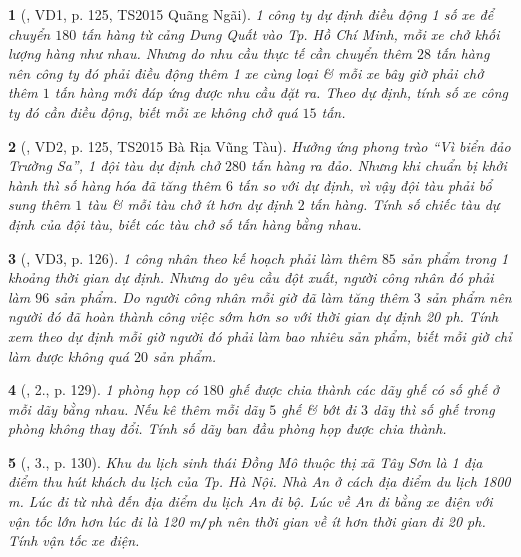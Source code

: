 \documentclass{article}
\newtheorem{baitoan}{}
\begin{document}
\begin{baitoan}[\cite{Kien_dai_so_9}, VD1, p. 125, TS2015 Quãng Ngãi]
	1 công ty dự định điều động 1 số xe để chuyển $180$ tấn hàng từ cảng Dung Quất vào Tp. Hồ Chí Minh, mỗi xe chở khối lượng hàng như nhau. Nhưng do nhu cầu thực tế cần chuyển thêm $28$ tấn hàng nên công ty đó phải điều động thêm 1 xe cùng loại \& mỗi xe bây giờ phải chở thêm $1$ tấn hàng mới đáp ứng được nhu cầu đặt ra. Theo dự định, tính số xe công ty đó cần điều động, biết mỗi xe không chở quá $15$ tấn.
\end{baitoan}

\begin{baitoan}[\cite{Kien_dai_so_9}, VD2, p. 125, TS2015 Bà Rịa Vũng Tàu]
	Hưởng ứng phong trào ``Vì biển đảo Trường Sa'', 1 đội tàu dự định chở $280$ tấn hàng ra đảo. Nhưng khi chuẩn bị khởi hành thì số hàng hóa đã tăng thêm $6$ tấn so với dự định, vì vậy đội tàu phải bổ sung thêm $1$ tàu \& mỗi tàu chở ít hơn dự định $2$ tấn hàng. Tính số chiếc tàu dự định của đội tàu, biết các tàu chở số tấn hàng bằng nhau.
\end{baitoan}

\begin{baitoan}[\cite{Kien_dai_so_9}, VD3, p. 126]
	1 công nhân theo kế hoạch phải làm thêm $85$ sản phẩm trong 1 khoảng thời gian dự định. Nhưng do yêu cầu đột xuất, người công nhân đó phải làm $96$ sản phẩm. Do người công nhân mỗi giờ đã làm tăng thêm $3$ sản phẩm nên người đó đã hoàn thành công việc sớm hơn so với thời gian dự định {\rm20 ph}. Tính xem theo dự định mỗi giờ người đó phải làm bao nhiêu sản phẩm, biết mỗi giờ chỉ làm được không quá $20$ sản phẩm.
\end{baitoan}

\begin{baitoan}[\cite{Kien_dai_so_9}, 2., p. 129]
	1 phòng họp có $180$ ghế được chia thành các dãy ghế có số ghế ở mỗi dãy bằng nhau. Nếu kê thêm mỗi dãy $5$ ghế \& bớt đi $3$ dãy thì số ghế trong phòng không thay đổi. Tính số dãy ban đầu phòng họp được chia thành.
\end{baitoan}

\begin{baitoan}[\cite{Kien_dai_so_9}, 3., p. 130]
	Khu du lịch sinh thái Đồng Mô thuộc thị xã Tây Sơn là 1 địa điểm thu hút khách du lịch của Tp. Hà Nội. Nhà An ở cách địa điểm du lịch {\rm1800 m}. Lúc đi từ nhà đến địa điểm du lịch An đi bộ. Lúc về An đi bằng xe điện với vận tốc lớn hơn lúc đi là {\rm120 m{\tt/}ph} nên thời gian về ít hơn thời gian đi {\rm20 ph}. Tính vận tốc xe điện.
\end{baitoan}
\end{document}
